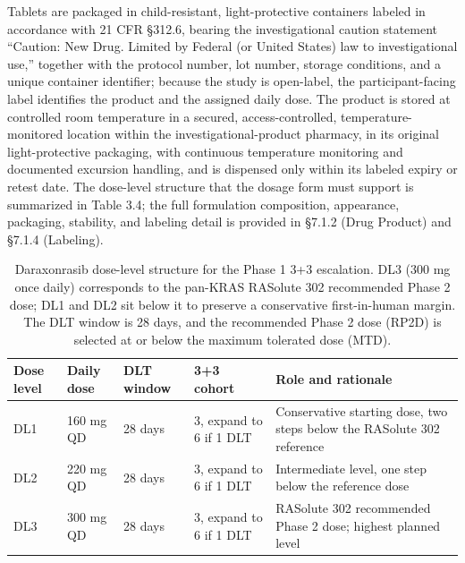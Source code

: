 Tablets are packaged in child-resistant, light-protective containers labeled in
accordance with 21 CFR \S 312.6, bearing the investigational caution statement
``Caution: New Drug. Limited by Federal (or United States) law to investigational
use,'' together with the protocol number, lot number, storage conditions, and a
unique container identifier; because the study is open-label, the participant-facing
label identifies the product and the assigned daily dose. The product is stored at
controlled room temperature in a secured, access-controlled, temperature-monitored
location within the investigational-product pharmacy, in its original
light-protective packaging, with continuous temperature monitoring and documented
excursion handling, and is dispensed only within its labeled expiry or retest date.
The dose-level structure that the dosage form must support is summarized in Table
3.4; the full formulation composition, appearance, packaging, stability, and labeling
detail is provided in \S 7.1.2 (Drug Product) and \S 7.1.4 (Labeling).

\begin{table}[t]
\caption{Daraxonrasib dose-level structure for the Phase 1 3+3 escalation. DL3 (300
mg once daily) corresponds to the pan-KRAS RASolute 302 recommended Phase 2 dose;
DL1 and DL2 sit below it to preserve a conservative first-in-human margin. The DLT
window is 28 days, and the recommended Phase 2 dose (RP2D) is selected at or below
the maximum tolerated dose (MTD).}
\label{tab:sec02-doselevels}
\centering
\begin{tabularx}{\textwidth}{L{1.6cm} L{2.5cm} C{1.7cm} L{3.0cm} Y}
\toprule
\textbf{Dose level} & \textbf{Daily dose} & \textbf{DLT window} & \textbf{3+3 cohort} & \textbf{Role and rationale} \\
\midrule
DL1 & 160 mg QD & 28 days & 3, expand to 6 if 1 DLT & Conservative starting dose, two steps below the RASolute 302 reference \\
DL2 & 220 mg QD & 28 days & 3, expand to 6 if 1 DLT & Intermediate level, one step below the reference dose \\
DL3 & 300 mg QD & 28 days & 3, expand to 6 if 1 DLT & RASolute 302 recommended Phase 2 dose; highest planned level \\
\bottomrule
\end{tabularx}
\end{table}


